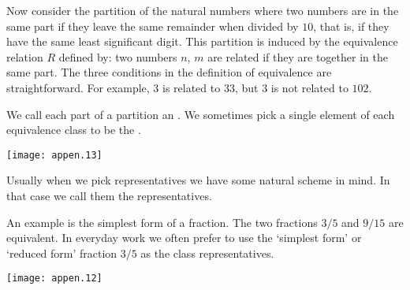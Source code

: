 Now consider the partition of the natural numbers where
two numbers are in the same part if they leave the same remainder when
divided by $10$, that is, if they have the same least significant digit.
This partition is induced by the equivalence relation $R$ defined by:
two numbers $n$, $m$ are related if they are together in the same part.
The three conditions in the definition of equivalence are straightforward.
For example, $3$ is related to $33$, but $3$ is not related to $102$.

We call each part of a partition an .%
We sometimes pick a single element of each equivalence class to be the 
.%
\begin{center}
  \texttt{[image: appen.13]}
\end{center}
Usually when we pick representatives we have some natural scheme in mind.
In that case we call them the
 representatives.%
%
%

An example is the simplest form of a fraction.
The two fractions \( 3/5 \) and \( 9/15 \) are equivalent.
In everyday work we often prefer to use the `simplest form' or `reduced form'
fraction $3/5$ as the class representatives.
\begin{center}
  \texttt{[image: appen.12]}
\end{center}
%
